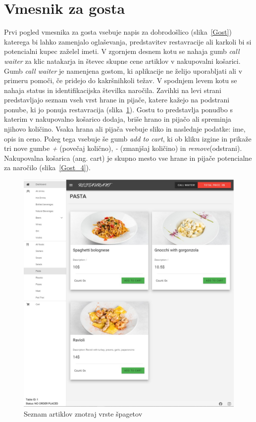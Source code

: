\documentclass[a4paper, 12pt]{book}
\begin{document}
\section{Vmesnik za gosta}
Prvi pogled vmesnika za gosta vsebuje napis za dobrodošlico (slika~\ref{Gost}) katerega bi lahko zamenjalo oglaševanja, predstavitev restavracije ali karkoli bi si potencialni kupec zaželel imeti. V zgornjem desnem kotu se nahaja gumb \textit{call waiter} za klic natakarja in števec skupne cene artiklov v nakupovalni košarici. Gumb \textit{call waiter} je namenjena gostom, ki aplikacije ne želijo uporabljati ali v primeru pomoči, če pridejo do kakršnihkoli težav. V spodnjem levem kotu se nahaja status in identifikacijska številka naročila. Zavihki na levi strani predstavljajo seznam vseh vrst hrane in pijače, katere kažejo na podstrani ponube, ki jo ponuja restavracija (slika~\ref{Gost_3}). Gostu to predstavlja ponudbo s katerim v nakupovalno košarico dodaja, briše hrano in pijačo ali spreminja njihovo količino. Vsaka hrana ali pijača vsebuje sliko in naslednje podatke: ime, opis in ceno. Poleg tega vsebuje še gumb \textit{add to cart}, ki ob kliku izgine in prikaže tri nove gumbe \textit{+} (povečaj količno), \textit{-} (zmanjšaj količino) in \textit{remove}(odstrani). Nakupovalna košarica (ang. cart) je skupno mesto vse hrane in pijače potencialne za naročilo (slika~\ref{Gost_4}).
\begin{figure}[!htb]
\begin{center}
\includegraphics[width=11.5cm]{gost_3.jpg}
\caption{Seznam artiklov znotraj vrste špagetov}
\label{Gost_3}
\end{center}
\end{figure}
\end{document}

